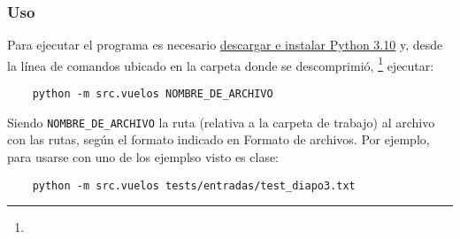 \documentclass[../tp3_grupo404.tex]{subfiles}
\begin{document}
\subsubsection{Uso}
Para ejecutar el programa es necesario
\href{https://www.python.org/downloads/}{descargar e instalar Python 3.10}
y, desde la línea de comandos ubicado en la carpeta donde se descomprimió,
\footnote{}
ejecutar:
\begin{verbatim}
    python -m src.vuelos NOMBRE_DE_ARCHIVO
\end{verbatim}
Siendo \texttt{NOMBRE\_DE\_ARCHIVO} la ruta (relativa a la carpeta de trabajo)
al archivo con las rutas, según el formato indicado en
Formato de archivos.
Por ejemplo, para usarse con uno de los ejemplso visto es clase:
\begin{verbatim}
    python -m src.vuelos tests/entradas/test_diapo3.txt
\end{verbatim}

\end{document}
